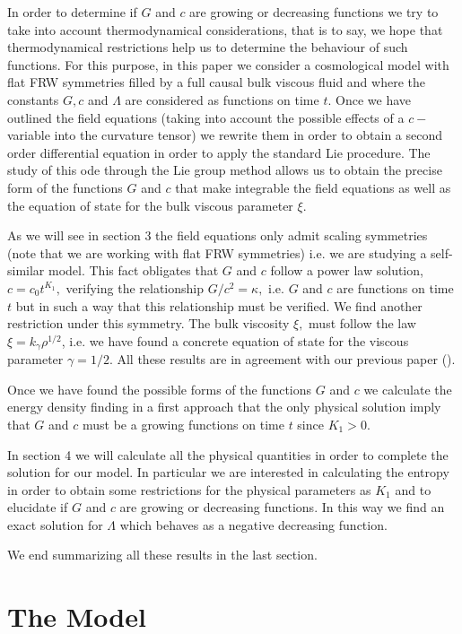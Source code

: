\documentclass{revtex4}
\begin{document}
In order to determine if $G$ and $c$ are growing or decreasing functions we
try to take into account thermodynamical considerations, that is to say, we
hope that thermodynamical restrictions help us to determine the behaviour of
such functions. For this purpose, in this paper we consider a cosmological
model with flat FRW symmetries filled by a full causal bulk viscous fluid
and where the constants $G,c$ and $\Lambda $ are considered as functions on
time $t.$ Once we have outlined the field equations (taking into account the
possible effects of a $c-$variable into the curvature tensor) we rewrite
them in order to obtain a second order differential equation in order to
apply the standard Lie procedure. The study of this ode through the Lie
group method allows us to obtain the precise form of the functions $G$ and $%
c $ that make integrable the field equations as well as the equation of
state for the bulk viscous parameter $\xi .$

As we will see in section 3 the field equations only admit scaling
symmetries (note that we are working with flat FRW symmetries) i.e. we are
studying a self-similar model. This fact obligates that $G$ and $c$ follow a
power law solution, $c=c_{0}t^{K_{1}},$ verifying the relationship $%
G/c^{2}=\kappa ,$ i.e. $G$ and $c$ are functions on time $t$ but in such a
way that this relationship must be verified. We find another restriction
under this symmetry. The bulk viscosity $\xi ,$ must follow the law $\xi
=k_{\gamma }\rho ^{1/2}$, i.e. we have found a concrete equation of state
for the viscous parameter $\gamma =1/2.$ All these results are in agreement
with our previous paper (\cite{Tony2}).

Once we have found the possible forms of the functions $G$ and $c$ we
calculate the energy density finding in a first approach that the only
physical solution imply that $G$ and $c$ must be a growing functions on time
$t$ since $K_{1}>0.$

In section 4 we will calculate all the physical quantities in order to
complete the solution for our model. In particular we are interested in
calculating the entropy in order to obtain some restrictions for the
physical parameters as $K_{1}$ and to elucidate if $G$ and $c$ are growing
or decreasing functions. In this way we find an exact solution for $\Lambda $
which behaves as a negative decreasing function.

We end summarizing all these results in the last section.

\section{The Model\label{M}}
\end{document}
